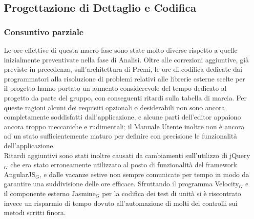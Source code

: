 \subsection{Progettazione di Dettaglio e Codifica}

\subsubsection{Consuntivo parziale}
Le ore effettive di questa macro-fase sono state molto diverse rispetto a quelle inizialmente preventivate nella fase di Analisi. Oltre alle correzioni aggiuntive, già previste in precedenza, sull'architettura di Premi, le ore di codifica dedicate dai programmatori alla risoluzione di problemi relativi alle librerie esterne scelte per il progetto hanno portato un aumento considerevole del tempo dedicato al progetto da parte del gruppo, con conseguenti ritardi sulla tabella di marcia. Per queste ragioni alcuni dei requisiti opzionali o desiderabili non sono ancora completamente soddisfatti dall'applicazione, e alcune parti dell'editor appaiono ancora troppo meccaniche e rudimentali; il Manuale Utente inoltre non è ancora ad un stato sufficientemente maturo per definire con precisione le funzionalità dell'applicazione. \\ 
Ritardi aggiuntivi sono stati inoltre causati da cambiamenti sull'utilizzo di jQuery$_G$ che era stato erroneamente utilizzato al posto di funzionalità del framework AngularJS$_G$, e dalle vacanze estive non sempre comunicate per tempo in modo da garantire una suddivisione delle ore efficace.
Sfruttando il programma Velocity$_G$ e il componente esterno Jasmine$_G$ per la codifica dei test di unità si è riscontrato invece un risparmio di tempo dovuto all'automazione di molti dei controlli sui metodi scritti finora. 


